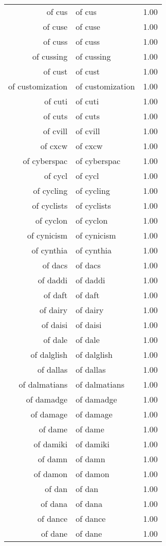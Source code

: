 \begin{table}[ht]
\begin{tabular}{rlr}
  of cus & of cus & 1.00 \\ 
  of cuse & of cuse & 1.00 \\ 
  of cuss & of cuss & 1.00 \\ 
  of cussing & of cussing & 1.00 \\ 
  of cust & of cust & 1.00 \\ 
  of customization & of customization & 1.00 \\ 
  of cuti & of cuti & 1.00 \\ 
  of cuts & of cuts & 1.00 \\ 
  of cvill & of cvill & 1.00 \\ 
  of cxcw & of cxcw & 1.00 \\ 
  of cyberspac & of cyberspac & 1.00 \\ 
  of cycl & of cycl & 1.00 \\ 
  of cycling & of cycling & 1.00 \\ 
  of cyclists & of cyclists & 1.00 \\ 
  of cyclon & of cyclon & 1.00 \\ 
  of cynicism & of cynicism & 1.00 \\ 
  of cynthia & of cynthia & 1.00 \\ 
  of dacs & of dacs & 1.00 \\ 
  of daddi & of daddi & 1.00 \\ 
  of daft & of daft & 1.00 \\ 
  of dairy & of dairy & 1.00 \\ 
  of daisi & of daisi & 1.00 \\ 
  of dale & of dale & 1.00 \\ 
  of dalglish & of dalglish & 1.00 \\ 
  of dallas & of dallas & 1.00 \\ 
  of dalmatians & of dalmatians & 1.00 \\ 
  of damadge & of damadge & 1.00 \\ 
  of damage & of damage & 1.00 \\ 
  of dame & of dame & 1.00 \\ 
  of damiki & of damiki & 1.00 \\ 
  of damn & of damn & 1.00 \\ 
  of damon & of damon & 1.00 \\ 
  of dan & of dan & 1.00 \\ 
  of dana & of dana & 1.00 \\ 
  of dance & of dance & 1.00 \\ 
  of dane & of dane & 1.00 \\ 

\end{tabular}
\end{table}
